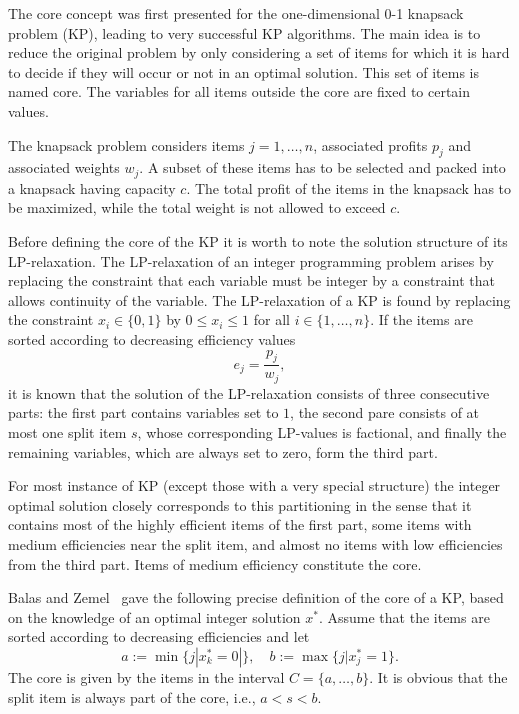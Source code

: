 The core concept was first presented for the one-dimensional 0-1 knapsack problem (KP),
leading to very successful KP algorithms.
The main idea is to reduce the original problem by only considering a set of
items for which it is hard to decide if they will occur or not in an optimal solution.
This set of items is named core.
The variables for all items outside the core are fixed to certain values.

The knapsack problem considers items $j = 1, \ldots, n$, associated profits $p_j$ and
associated weights $w_j$.
A subset of these items has to be selected and packed into a knapsack having capacity $c$.
The total profit of the items in the knapsack has to be maximized, while the
total weight is not allowed to exceed $c$.

Before defining the core of the KP it is worth to note the solution structure
of its LP-relaxation.
The LP-relaxation of an integer programming problem arises by replacing the
constraint that each variable must be integer by a constraint that allows
continuity of the variable.
The LP-relaxation of a KP is found by replacing the constraint $x_i \in \{0,1\}$
by $0 \leqslant x_i \leqslant 1$ for all $i \in \{1, \ldots, n\}$.
If the items are sorted according to decreasing efficiency values
\begin{displaymath}
  e_j = \frac{p_j}{w_j},
\end{displaymath}
it is known that the solution of the LP-relaxation consists of
three consecutive parts: the first part contains variables set to $1$, the second
pare consists of at most one split item $s$, whose corresponding LP-values is
factional, and finally the remaining variables, which are always set to zero,
form the third part.

For most instance of KP (except those with a very special structure) the integer
optimal solution closely corresponds to this partitioning in the sense that it
contains most of the highly efficient items of the first part, some items with
medium efficiencies near the split item, and almost no items with low efficiencies
from the third part.
Items of medium efficiency constitute the core.

Balas and Zemel~\cite{balas1980algorithm} gave the following precise definition
of the core of a KP, based on the knowledge of an optimal integer solution $x^*$.
Assume that the items are sorted according to decreasing efficiencies and let
\begin{displaymath}
  a := \min\{ j | x_k^* = 0 |\}, \quad b := \max\{ j | x_j^* = 1 \}.
\end{displaymath}
The core is given by the items in the interval $C = \{a, \ldots, b\}$.
It is obvious that the split item is always part of the core, i.e., $a < s < b$.

